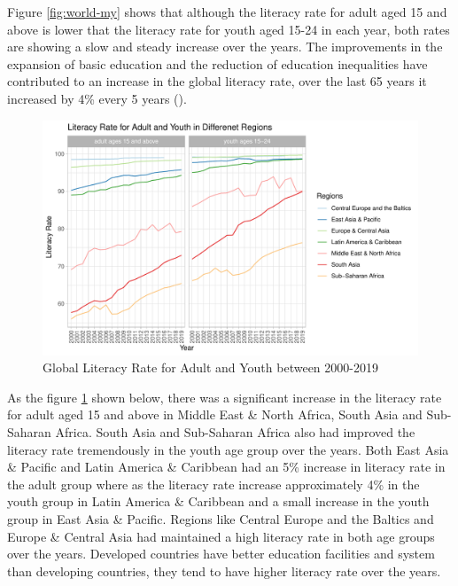 \documentclass[11pt,a4paper,]{article}
\begin{document}
Figure \ref{fig:world-my} shows that although the literacy rate for adult aged 15 and above is lower that the literacy rate for youth aged 15-24 in each year, both rates are showing a slow and steady increase over the years. The improvements in the expansion of basic education and the reduction of education inequalities have contributed to an increase in the global literacy rate, over the last 65 years it increased by 4\% every 5 years (\textcite{owidliteracy}).

\begin{figure}
\centering
\includegraphics{report_files/figure-latex/regions-my-1.pdf}
\caption{\label{fig:regions-my}Global Literacy Rate for Adult and Youth between 2000-2019}
\end{figure}

As the figure \ref{fig:regions-my} shown below, there was a significant increase in the literacy rate for adult aged 15 and above in Middle East \& North Africa, South Asia and Sub-Saharan Africa. South Asia and Sub-Saharan Africa also had improved the literacy rate tremendously in the youth age group over the years. Both East Asia \& Pacific and Latin America \& Caribbean had an 5\% increase in literacy rate in the adult group where as the literacy rate increase approximately 4\% in the youth group in Latin America \& Caribbean and a small increase in the youth group in East Asia \& Pacific. Regions like Central Europe and the Baltics and Europe \& Central Asia had maintained a high literacy rate in both age groups over the years. Developed countries have better education facilities and system than developing countries, they tend to have higher literacy rate over the years.
\end{document}
